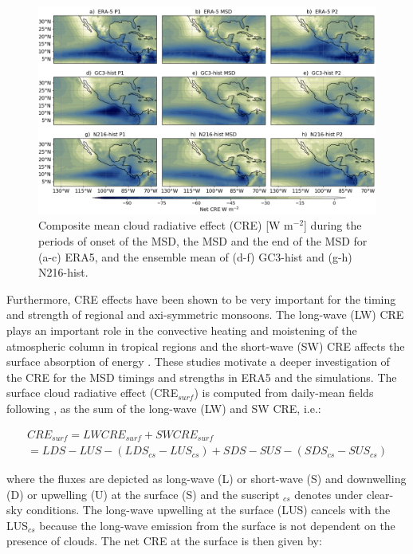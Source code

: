 \begin{figure}[t!]
\includegraphics[width=\linewidth]{figures/fig4_creclim_3.png}
\caption[Composites of cloud radiative effects]{Composite mean cloud radiative effect (CRE) [W m$^{-2}$] during the periods of onset of the MSD, the MSD and the end of the MSD for (a-c) ERA5, and the ensemble mean of (d-f) GC3-hist and (g-h) N216-hist.}
\label{fig:cre_comp}
\end{figure}


Furthermore,  CRE effects have been shown to be very important for the timing and strength of regional \citep{guo2015} and axi-symmetric \citep{byrne2020} monsoons. The long-wave (LW) CRE plays an important role in the convective heating and moistening of the atmospheric column in tropical regions and the short-wave (SW) CRE affects the surface absorption of energy \citep{allan2011}. 
These studies motivate a deeper investigation of the CRE for the MSD timings and strengths in ERA5 and the simulations. The surface cloud radiative effect (CRE$_{surf}$) is computed from daily-mean fields following \cite{allan2011}, as the sum of the long-wave (LW) and SW CRE, i.e.:

\begin{multline}
CRE_{surf}=LW CRE_{surf} +SW CRE_{surf} \\ = LDS-LUS -(LDS_{cs}-LUS_{cs})+SDS-SUS-(SDS_{cs}-SUS_{cs})
\end{multline}

where the fluxes are depicted as long-wave (L) or short-wave (S) and downwelling (D) or upwelling (U) at the surface (S) and the suscript $_{cs}$ denotes under clear-sky conditions. The long-wave upwelling at the surface (LUS) cancels with the LUS$_{cs}$ because the long-wave emission from the surface is not dependent on the presence of clouds. The net CRE at the surface is then given by:


